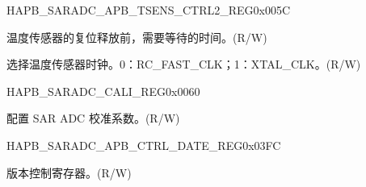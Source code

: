 \begin{register}{H}{APB\_SARADC\_APB\_TSENS\_CTRL2\_REG}{0x005C}\label{regdesc:APBSARADCTSENSCTRL2REG}
%
%
%
%
\regnewline%
\begin{regdesc}\begin{reglist}
\label{fielddesc:APBSARADCTSENSXPDWAIT}\item [APB\_SARADC\_TSENS\_XPD\_WAIT] 温度传感器的复位释放前，需要等待的时间。(R/W)
\label{fielddesc:APBSARADCTSENSCLKSEL}\item [APB\_SARADC\_TSENS\_CLK\_SEL] 选择温度传感器时钟。0：RC\_FAST\_CLK；1：XTAL\_CLK。(R/W)
\end{reglist}\end{regdesc}
\end{register}


\begin{register}{H}{APB\_SARADC\_CALI\_REG}{0x0060}\label{regdesc:APBSARADCCALIREG}
%
%
\regnewline%
\begin{regdesc}\begin{reglist}
\label{fielddesc:APBSARADCAPBSARADCCALICFG}\item [APB\_SARADC\_CALI\_CFG] 配置 SAR ADC 校准系数。(R/W)
\end{reglist}\end{regdesc}
\end{register}


\begin{register}{H}{APB\_SARADC\_APB\_CTRL\_DATE\_REG}{0x03FC}\label{regdesc:APBSARADCCTRLDATEREG}
%
\regnewline%
\begin{regdesc}\begin{reglist}
\label{fielddesc:APBSARADCDATE}\item [APB\_SARADC\_DATE] 版本控制寄存器。(R/W)
\end{reglist}\end{regdesc}
\end{register}
